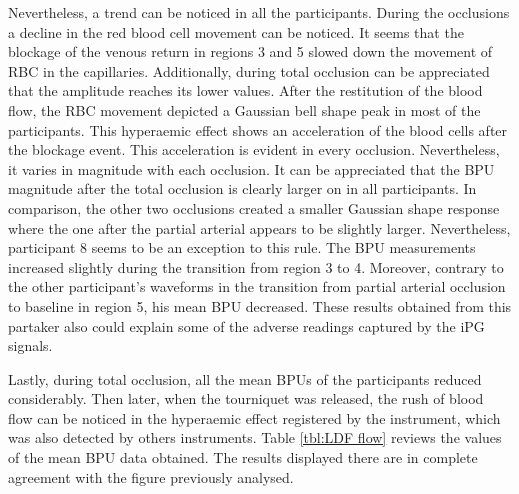 Nevertheless, a trend can be noticed in all the participants. During the occlusions a decline in the red blood cell movement can be noticed. It seems that the blockage of the venous return in regions 3 and 5 slowed down the movement of RBC in the capillaries. Additionally, during total occlusion can be appreciated that the amplitude reaches its lower values. After the restitution of the blood flow, the RBC movement depicted a Gaussian bell shape peak in most of the participants. This hyperaemic effect shows an acceleration of the blood cells after the blockage event. This acceleration is evident in every occlusion. Nevertheless, it varies in magnitude with each occlusion. It can be appreciated that the BPU magnitude after the total occlusion is clearly larger on in all participants. In comparison, the other two occlusions created a smaller Gaussian shape response where the one after the partial arterial appears to be slightly larger. Nevertheless, participant 8 seems to be an exception to this rule. The BPU measurements increased slightly during the transition from region 3 to 4. Moreover, contrary to the other participant's waveforms in the transition from partial arterial occlusion to baseline in region 5, his mean BPU decreased. These results obtained from this partaker also could explain some of the adverse readings captured by the iPG signals.

Lastly, during total occlusion, all the mean BPUs of the participants reduced considerably. Then later, when the tourniquet was released, the rush of blood flow can be noticed in the hyperaemic effect registered by the instrument, which was also detected by others instruments. Table \ref{tbl:LDF flow} reviews the values of the mean BPU data obtained. The results displayed there are in complete agreement with the figure previously analysed.

